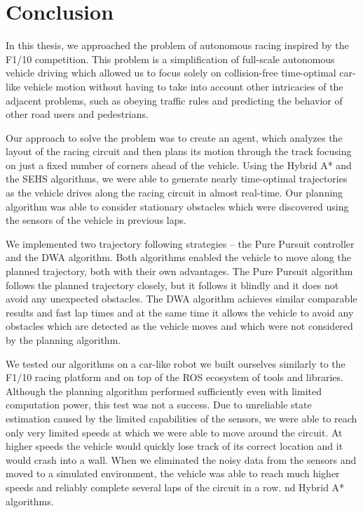 \chapter*{Conclusion}

In this thesis, we approached the problem of autonomous racing inspired by the F1/10 competition. This problem is a simplification of full-scale autonomous vehicle driving which allowed us to focus solely on collision-free time-optimal car-like vehicle motion without having to take into account other intricacies of the adjacent problems, such as obeying traffic rules and predicting the behavior of other road users and pedestrians.

Our approach to solve the problem was to create an agent, which analyzes the layout of the racing circuit and then plans its motion through the track focusing on just a fixed number of corners ahead of the vehicle. Using the Hybrid A* and the \gls{SEHS} algorithms, we were able to generate nearly time-optimal trajectories as the vehicle drives along the racing circuit in almost real-time. Our planning algorithm was able to consider stationary obstacles which were discovered using the sensors of the vehicle in previous laps.

We implemented two trajectory following strategies – the Pure Pursuit controller and the \gls{DWA} algorithm. Both algorithms enabled the vehicle to move along the planned trajectory, both with their own advantages. The Pure Pursuit algorithm follows the planned trajectory closely, but it follows it blindly and it does not avoid any unexpected obstacles. The \gls*{DWA} algorithm achieves similar comparable results and fast lap times and at the same time it allows the vehicle to avoid any obstacles which are detected as the vehicle moves and which were not considered by the planning algorithm.

We tested our algorithms on a car-like robot we built ourselves similarly to the F1/10 racing platform and on top of the \gls{ROS} ecosystem of tools and libraries. Although the planning algorithm performed sufficiently even with limited computation power, this test was not a success. Due to unreliable state estimation caused by the limited capabilities of the sensors, we were able to reach only very limited speeds at which we were able to move around the circuit. At higher speeds the vehicle would quickly lose track of its correct location and it would crash into a wall. When we eliminated the noisy data from the sensors and moved to a simulated environment, the vehicle was able to reach much higher speeds and reliably complete several laps of the circuit in a row.
nd Hybrid A* algorithms.

